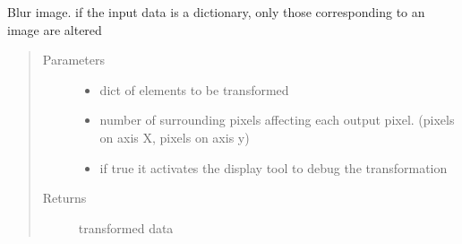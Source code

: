 \documentclass[letterpaper,10pt,english]{sphinxmanual}
\begin{document}
\begin{fulllineitems}
\label{\detokenize{ida_lib.operations:ida_lib.operations.transforms.blur}}
Blur image.  if the input data is a dictionary, only those corresponding to an image are altered
\begin{quote}\begin{description}
\item[{Parameters}] \leavevmode\begin{itemize}
\item {} 
 \textendash{} dict of elements to be transformed

\item {} 
 \textendash{} number of surrounding pixels affecting each output pixel. (pixels on axis X, pixels on axis y)

\item {} 
 \textendash{} if true it activates the display tool to debug the transformation

\end{itemize}

\item[{Returns}] \leavevmode
transformed data

\end{description}\end{quote}

\end{fulllineitems}

\end{document}
